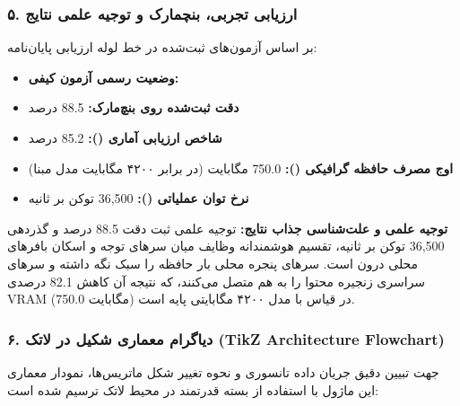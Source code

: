 \subsubsection*{۵. ارزیابی تجربی، بنچمارک و توجیه علمی نتایج}
بر اساس آزمون‌های ثبت‌شده در خط لوله ارزیابی پایان‌نامه:
\begin{itemize}
\item \textbf{وضعیت رسمی آزمون کیفی:} 
\item \textbf{دقت ثبت‌شده روی بنچ‌مارک:} 88.5 درصد
\item \textbf{شاخص ارزیابی آماری ():} 85.2 درصد
\item \textbf{اوج مصرف حافظه گرافیکی ():} 750.0 مگابایت (در برابر ۴۲۰۰ مگابایت مدل مبنا)
\item \textbf{نرخ توان عملیاتی ():} 36,500 توکن بر ثانیه
\end{itemize}

\textbf{توجیه علمی و علت‌شناسی جذاب نتایج:}
توجیه علمی ثبت دقت 88.5 درصد و گذردهی 36,500 توکن بر ثانیه، تقسیم هوشمندانه وظایف میان سرهای توجه و اسکان بافرهای محلی درون  است. سرهای پنجره محلی بار حافظه را سبک نگه داشته و سرهای سراسری زنجیره محتوا را به هم متصل می‌کنند، که نتیجه آن کاهش 82.1 درصدی VRAM (750.0 مگابایت) در قیاس با مدل ۴۲۰۰ مگابایتی پایه است.



\subsubsection*{۶. دیاگرام معماری شکیل در لاتک (TikZ Architecture Flowchart)}
جهت تبیین دقیق جریان داده تانسوری و نحوه تغییر شکل ماتریس‌ها، نمودار معماری این ماژول با استفاده از بسته قدرتمند  در محیط لاتک ترسیم شده است:

\begin{center}
\end{center}

